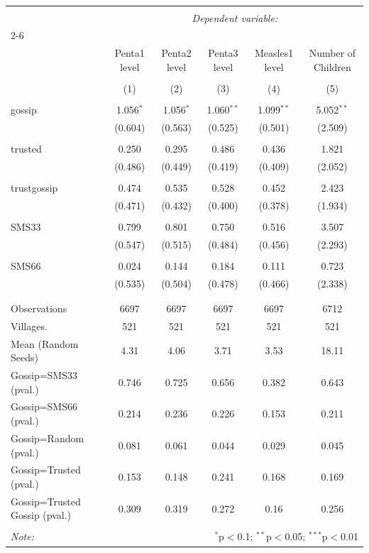 
\begin{table}[!htbp] \centering 
  \caption{} 
  \label{} 
\scriptsize 
\begin{tabular}{@{\extracolsep{0.25pt}}lccccc} 
\\[-1.8ex]\hline 
\hline \\[-1.8ex] 
 & \multicolumn{5}{c}{\textit{Dependent variable:}} \\ 
\cline{2-6} 
\\[-1.8ex] & Penta1 level & Penta2 level & Penta3 level & Measles1 level & Number of Children \\ 
\\[-1.8ex] & (1) & (2) & (3) & (4) & (5)\\ 
\hline \\[-1.8ex] 
 gossip & 1.056$^{*}$ & 1.056$^{*}$ & 1.060$^{**}$ & 1.099$^{**}$ & 5.052$^{**}$ \\ 
  & (0.604) & (0.563) & (0.525) & (0.501) & (2.509) \\ 
  & & & & & \\ 
 trusted & 0.250 & 0.295 & 0.486 & 0.436 & 1.821 \\ 
  & (0.486) & (0.449) & (0.419) & (0.409) & (2.052) \\ 
  & & & & & \\ 
 trustgossip & 0.474 & 0.535 & 0.528 & 0.452 & 2.423 \\ 
  & (0.471) & (0.432) & (0.400) & (0.378) & (1.934) \\ 
  & & & & & \\ 
 SMS33 & 0.799 & 0.801 & 0.750 & 0.516 & 3.507 \\ 
  & (0.547) & (0.515) & (0.484) & (0.456) & (2.293) \\ 
  & & & & & \\ 
 SMS66 & 0.024 & 0.144 & 0.184 & 0.111 & 0.723 \\ 
  & (0.535) & (0.504) & (0.478) & (0.466) & (2.338) \\ 
  & & & & & \\ 
\hline \\[-1.8ex] 
Observations & 6697 & 6697 & 6697 & 6697 & 6712 \\ 
Villages. & 521 & 521 & 521 & 521 & 521 \\ 
Mean (Random Seeds) & 4.31 & 4.06 & 3.71 & 3.53 & 18.11 \\ 
Gossip=SMS33 (pval.) & 0.746 & 0.725 & 0.656 & 0.382 & 0.643 \\ 
Gossip=SMS66 (pval.) & 0.214 & 0.236 & 0.226 & 0.153 & 0.211 \\ 
Gossip=Random (pval.) & 0.081 & 0.061 & 0.044 & 0.029 & 0.045 \\ 
Gossip=Trusted (pval.) & 0.153 & 0.148 & 0.241 & 0.168 & 0.169 \\ 
Gossip=Trusted Gossip (pval.) & 0.309 & 0.319 & 0.272 & 0.16 & 0.256 \\ 
\hline 
\hline \\[-1.8ex] 
\textit{Note:}  & \multicolumn{5}{r}{$^{*}$p$<$0.1; $^{**}$p$<$0.05; $^{***}$p$<$0.01} \\ 
\end{tabular} 
\end{table} 
